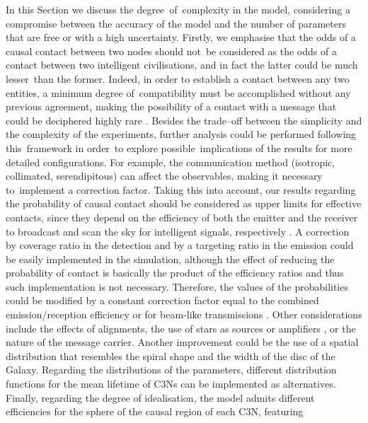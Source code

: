 \documentclass[crop]{CSLB}
\newcommand{\ceti}{C3N}
\newcommand{\cetis}{C3Ns}
\begin{document}
In this Section we discuss the degree of complexity in the model, considering a
compromise between the accuracy of the model and the number of parameters that
are free or with a high uncertainty.
%
Firstly, we emphasise that the odds of a causal contact between two nodes
should not be considered as the odds of a contact between two intelligent
civilisations, and in fact the latter could be much lesser than the former.
%
Indeed, in order to establish a contact between any two entities, a minimum
degree of compatibility must be accomplished without any previous agreement,
making the possibility of a contact with a message that could be deciphered
highly rare \citep[see e.g. ][]{forgan_collimated_2014}.
%
Besides the trade--off between the simplicity and the complexity of the
experiments, further analysis could be performed following this framework in
order to explore possible implications of the results for more detailed
configurations.
%
For example, the communication method (isotropic, collimated, serendipitous)
can affect the observables, making it necessary to implement a correction
factor.
%
Taking this into account, our results regarding the probability of causal
contact should be considered as upper limits for effective contacts, since they
depend on the efficiency of both the emitter and the receiver to broadcast and
scan the sky for intelligent signals, respectively
\citep{grimaldi_signal_2017}.
%
A correction by coverage ratio in the detection and by a targeting ratio in the
emission could be easily implemented in the simulation, although the effect of
reducing the probability of contact is basically the product of the efficiency
ratios and thus such implementation is not necessary.
%
Therefore, the values of the probabilities could be modified by a constant
correction factor equal to the combined emission/reception efficiency
\citep{smith_broadcasting_2009, anchordoqui_upper_2019, forgan_collimated_2014}
or for beam-like transmissions \citep{grimaldi_signal_2017}. 
%
Other considerations include the effects of alignments, the use of stars as
sources or amplifiers \citep{Edmondson2003, borra_searching_2012}, or the
nature of the message carrier.
%
Another improvement could be the use of a spatial distribution that resembles
the spiral shape and the width of the disc of the Galaxy.
%
Regarding the distributions of the parameters, different distribution functions
for the mean lifetime of \cetis{} can be implemented as alternatives.
%
Finally, regarding the degree of idealisation, the model admits different
efficiencies for the sphere of the causal region of each \ceti{}, featuring
\end{document}
